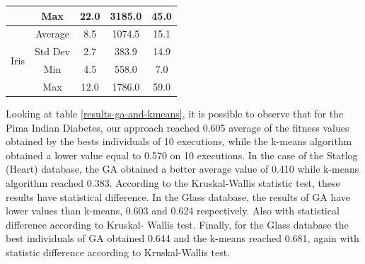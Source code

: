 \documentclass[journal]{IEEEtran}
\begin{document}
\begin{table}[]
\begin{tabular}{|c|c|c|c|c|}
			& Max                                      & 22.0                                                                                          & 3185.0                                                                                                          & 45.0                                                                                                \\ \hline
			\multirow{4}{*}{Iris}                  & Average                                  & 8.5                                                                                           & 1074.5                                                                                                          & 15.1                                                                                                \\ \cline{2-5} 
			& Std Dev                                  & 2.7                                                                                           & 383.9                                                                                                           & 14.9                                                                                                \\ \cline{2-5} 
			& Min                                      & 4.5                                                                                           & 558.0                                                                                                           & 7.0                                                                                                 \\ \cline{2-5} 
			& Max                                      & 12.0                                                                                          & 1786.0                                                                                                          & 59.0                                                                                                \\ \hline
		\end{tabular}
	\end{table}
	
	Looking at table \ref{results-ga-and-kmeans}, it is possible to observe that for the Pima Indian Diabetes, our approach reached 0.605 average of the fitness values obtained by the bests individuals of 10 executions, while the k-means algorithm obtained a lower value equal to 0.570 on 10 executions. 
	In the case of the Statlog (Heart) database,  the GA obtained a better average value of 0.410 while k-means algorithm reached 0.383. According to the  Kruskal-Wallis statistic test, these results have statistical difference. 
	In the Glass database, the results of GA have lower values than k-means, 0.603 and 0.624 respectively. Also with statistical difference according to Kruskal- Wallis test. 
	Finally, for the Glass database the best individuals of GA obtained 0.644 and the k-means reached 0.681, again with statistic difference according to Kruskal-Wallis test.
	
\end{document}
